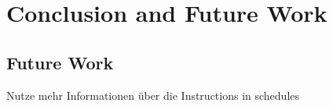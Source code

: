 \chapter{Conclusion and Future Work}
\label{sec:conclusion}
\section{Future Work}
Nutze mehr Informationen über die Instructions in schedules
